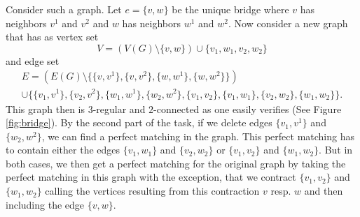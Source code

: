 \documentclass{scrartcl}
\begin{document}
\begin{enumerate}
Consider such a graph. Let $e=\{v,w\}$ be the unique bridge where $v$ has neighbors $v^1$ and $v^2$ and $w$ has neighbors $w^1$ and $w^2$. Now consider a new graph that has as vertex set
\[
V = (V(G) \setminus \{v,w\})\cup \{v_1, w_1, v_2, w_2\}
\]
and edge set 
\begin{multline*}
E = (E(G) \setminus \{\{v,v^1\},\{v,v^2\},\{w,w^1\},\{w,w^2\}\})\\ \cup \{\{v_1,v^1\},\{v_2,v^2\},\{w_1,w^1\},\{w_2,w^2\},\{v_1,v_2\},\{v_1,w_1\},\{v_2,w_2\},\{w_1,w_2\}\}.
\end{multline*}
This graph then is $3$-regular and $2$-connected as one easily verifies (See Figure \ref{fig:bridge}). By the second part of the task, if we delete edges $\{v_1,v^1\}$ and $\{w_2,w^2\}$, we can find a perfect matching in the graph. This perfect matching has to contain either the edges $\{v_1,w_1\}$ and $\{v_2,w_2\}$ or $\{v_1, v_2\}$ and $\{w_1, w_2\}$. But in both cases, we then get a perfect matching for the original graph by taking the perfect matching in this graph with the exception, that we contract $\{v_1, v_2\}$ and $\{w_1, w_2\}$ calling the vertices resulting from this contraction $v$ resp. $w$ and then including the edge $\{v,w\}$. 

\begin{figure}
\begin{subfigure}[c]{.5\linewidth}
\centering
{}
\end{subfigure}
\end{figure}
\end{enumerate}
\end{document}

